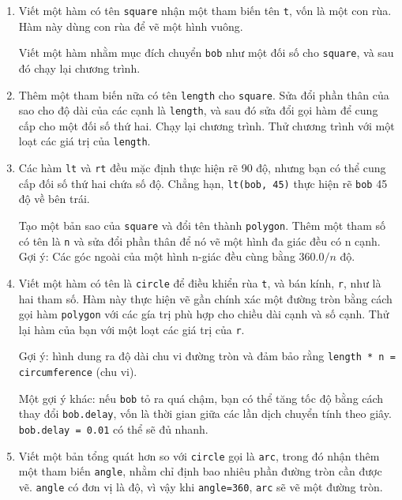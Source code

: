 \documentclass[11pt]{book}
\begin{document}
\begin{enumerate}

\item Viết một hàm có tên {\tt square} nhận một tham biến tên 
{\tt t}, vốn là một con rùa. Hàm này dùng con rùa để vẽ một
hình vuông.

Viết một hàm nhằm mục đích chuyển {\tt bob} như một đối số cho 
{\tt square}, và sau đó chạy lại chương trình.

\item Thêm một tham biến nữa có tên {\tt length} cho {\tt square}.
Sửa đổi phần thân của sao cho độ dài của các cạnh là {\tt length}, 
và sau đó sửa đổi gọi hàm để cung cấp cho một đối số thứ hai. 
Chạy lại chương trình. Thử chương trình với một loạt các giá trị của 
{\tt length}.

\item Các hàm {\tt lt} và {\tt rt} đều mặc định thực hiện rẽ 90 độ,
nhưng bạn có thể cung cấp đối số thứ hai chứa số độ. Chẳng hạn,
{\tt lt(bob, 45)} thực hiện rẽ {\tt bob} 45 độ về bên trái.

Tạo một bản sao của {\tt square} và đổi tên thành {\tt polygon}.  Thêm
một tham số có tên là {\tt n} và sửa đổi phần thân để nó vẽ một hình
đa giác đều có n cạnh. Gợi ý: Các góc ngoài của một hình n-giác đều cùng
bằng $360.0 / n$ độ.


\item Viết một hàm có tên là {\tt circle} để điều khiển rùa {\tt t},
và bán kính, {\tt r}, như là hai tham số. Hàm này thực hiện vẽ gần chính xác
một đường tròn bằng cách gọi hàm {\tt polygon} với các gía trị phù hợp
cho chiều dài cạnh và số cạnh. Thử lại hàm của bạn với một loạt các
giá trị của {\tt r}.


Gợi ý: hình dung ra độ dài chu vi đường tròn và đảm bảo rằng 
{\tt length * n = circumference} (chu vi).

Một gợi ý khác: nếu {\tt bob} tỏ ra quá chậm, bạn có thể tăng tốc độ
bằng cách thay đổi {\tt bob.delay}, vốn là thời gian giữa các lần dịch chuyển
tính theo giây. {\tt bob.delay = 0.01} có thể sẽ đủ nhanh.

\item Viết một bản tổng quát hơn so với {\tt circle} gọi là {\tt arc},
trong đó nhận thêm một tham biến {\tt angle}, nhằm chỉ định bao nhiêu
phần đường tròn cần được vẽ.  {\tt angle} có đơn vị là độ, 
vì vậy khi {\tt angle=360}, {\tt arc} sẽ vẽ một đường tròn.


\end{enumerate}
\end{document}

